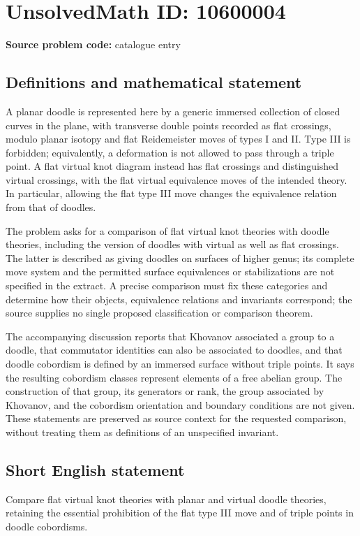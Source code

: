\documentclass[11pt]{article}
\begin{document}
\section*{UnsolvedMath ID: 10600004}
\textbf{Source problem code:} catalogue entry
\subsection{Definitions and mathematical statement}
A planar doodle is represented here by a generic immersed collection of closed curves in the plane, with transverse double points recorded as flat crossings, modulo planar isotopy and flat Reidemeister moves of types I and II. Type III is forbidden; equivalently, a deformation is not allowed to pass through a triple point. A flat virtual knot diagram instead has flat crossings and distinguished virtual crossings, with the flat virtual equivalence moves of the intended theory. In particular, allowing the flat type III move changes the equivalence relation from that of doodles.

The problem asks for a comparison of flat virtual knot theories with doodle theories, including the version of doodles with virtual as well as flat crossings. The latter is described as giving doodles on surfaces of higher genus; its complete move system and the permitted surface equivalences or stabilizations are not specified in the extract. A precise comparison must fix these categories and determine how their objects, equivalence relations and invariants correspond; the source supplies no single proposed classification or comparison theorem.

The accompanying discussion reports that Khovanov associated a group to a doodle, that commutator identities can also be associated to doodles, and that doodle cobordism is defined by an immersed surface without triple points. It says the resulting cobordism classes represent elements of a free abelian group. The construction of that group, its generators or rank, the group associated by Khovanov, and the cobordism orientation and boundary conditions are not given. These statements are preserved as source context for the requested comparison, without treating them as definitions of an unspecified invariant.
\subsection{Short English statement}
Compare flat virtual knot theories with planar and virtual doodle theories, retaining the essential prohibition of the flat type III move and of triple points in doodle cobordisms.
\end{document}
